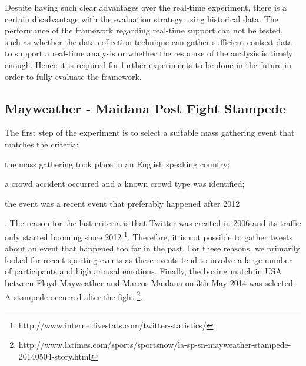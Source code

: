 Despite having such clear advantages over the real-time experiment, there is a certain disadvantage with the evaluation strategy using historical data. The performance of the framework regarding real-time support can not be tested, such as whether the data collection technique can gather sufficient context data to support a real-time analysis or whether the response of the analysis is timely enough. Hence it is required for further experiments to be done in the future in order to fully evaluate the framework.

\subsection{Mayweather - Maidana Post Fight Stampede}

The first step of the experiment is to select a suitable mass gathering event that matches the criteria:
\begin{inparaenum}[i)]
\item the mass gathering took place in an English speaking country;
\item a crowd accident occurred and a known crowd type was identified;
\item the event was a recent event that preferably happened after 2012
\end{inparaenum}. The reason for the last criteria is that Twitter was created in 2006 and its traffic only started booming since 2012 \footnote{http://www.internetlivestats.com/twitter-statistics/}. Therefore, it is not possible to gather tweets about an event that happened too far in the past. For these reasons, we primarily looked for recent sporting events as these events tend to involve a large number of participants and high arousal emotions. Finally, the boxing match in USA between Floyd Mayweather and Marcos Maidana on 3th May 2014 was selected. A stampede occurred after the fight \footnote{http://www.latimes.com/sports/sportsnow/la-sp-sn-mayweather-stampede-20140504-story.html}. 

